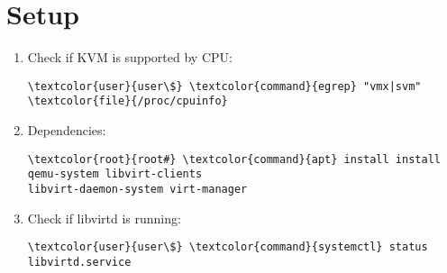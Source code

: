 \documentclass[10pt, a4paper, onecolumn, openany]{book} %
\begin{document}
\section{Setup}
\begin{enumerate}
    \item Check if KVM is supported by CPU:
\begin{Verbatim}[commandchars=\\\{\}]
\textcolor{user}{user\$} \textcolor{command}{egrep} "vmx|svm" \textcolor{file}{/proc/cpuinfo}
\end{Verbatim}
    \item Dependencies:
\begin{Verbatim}[commandchars=\\\{\}]
\textcolor{root}{root#} \textcolor{command}{apt} install install qemu-system libvirt-clients 
libvirt-daemon-system virt-manager
\end{Verbatim}
    \item Check if libvirtd is running:
\begin{Verbatim}[commandchars=\\\{\}]
\textcolor{user}{user\$} \textcolor{command}{systemctl} status libvirtd.service
\end{Verbatim}
\end{enumerate}
\end{document}
